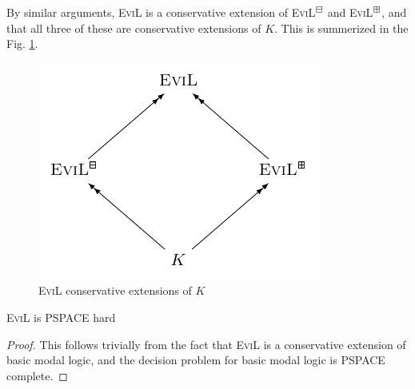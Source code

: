 By similar arguments, \textsc{EviL} is a conservative extension of \textsc{EviL}$^\boxminus$ and \textsc{EviL}$^\boxplus$, and that all three of these are conservative extensions of $K$.  This is summerized in the Fig. \ref{conservative-extensions}.

\begin{figure}[ht]
\begin{center}
\includegraphics[]{logics/evils.pdf}
\end{center}
\caption{\textsc{EviL} conservative extensions of $K$}
\label{conservative-extensions}
\end{figure}

\begin{lemma}
	\textsc{EviL} is \textsf{PSPACE} hard 
\end{lemma}
\begin{proof}
This follows trivially from the fact that \textsc{EviL} is a conservative extension of basic modal logic, and the decision problem for basic modal logic is \textsf{PSPACE} complete.
\end{proof}
